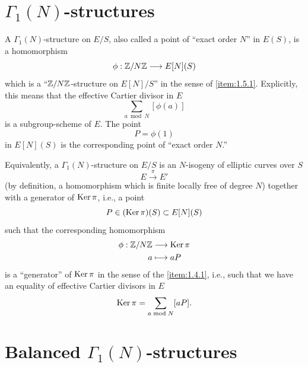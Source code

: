 \section{$\Gamma_1(N)$-structures}
\label{sec:3.2}

A $\Gamma_1(N)$-structure on $E/S$, also called a point of ``exact order $N$'' in $E(S)$, is a homomorphism
\begin{equation}\label{eq:3.2.1}
\phi : \mathbb{Z}/N\mathbb{Z} \longrightarrow E[N](S)
\end{equation}
which is a ``$\mathbb{Z}/N\mathbb{Z}$-structure on $E[N]/S$'' in the sense of \ref{item:1.5.1}. Explicitly, this means that the effective Cartier divisor in $E$
\begin{equation}\label{eq:3.2.2}
\sum_{a \bmod N} [\phi(a)]
\end{equation}
is a subgroup-scheme of $E$. The point
\[
P = \phi(1)
\]
in $E[N](S)$ is the corresponding point of ``exact order $N$.''

Equivalently, a $\Gamma_1(N)$-structure on $E/S$ is an $N$-isogeny of elliptic curves over $S$
\begin{equation}\label{eq:3.2.3}
E \xrightarrow{\ \pi\ } E'
\end{equation}
(by definition, a homomorphism which is finite locally free of degree $N$) together with a generator of $\operatorname{Ker} \pi$, i.e., a point
\begin{equation}\label{eq:3.2.4}
P \in (\operatorname{Ker} \pi)(S) \subset E[N](S)
\end{equation}
such that the corresponding homomorphism
\[
\begin{aligned}
\phi : \mathbb{Z}/N\mathbb{Z} &\longrightarrow \operatorname{Ker} \pi \\
a &\longmapsto aP
\end{aligned}
\]
is a ``generator'' of $\operatorname{Ker} \pi$ in the sense of the \ref{item:1.4.1}, i.e., such that we have an equality of effective Cartier divisors in $E$
\begin{equation}\label{eq:3.2.5}
\operatorname{Ker} \pi = \sum_{a \bmod N} [aP].
\end{equation}

\section{Balanced $\Gamma_1(N)$-structures}
\label{sec:3.3}


